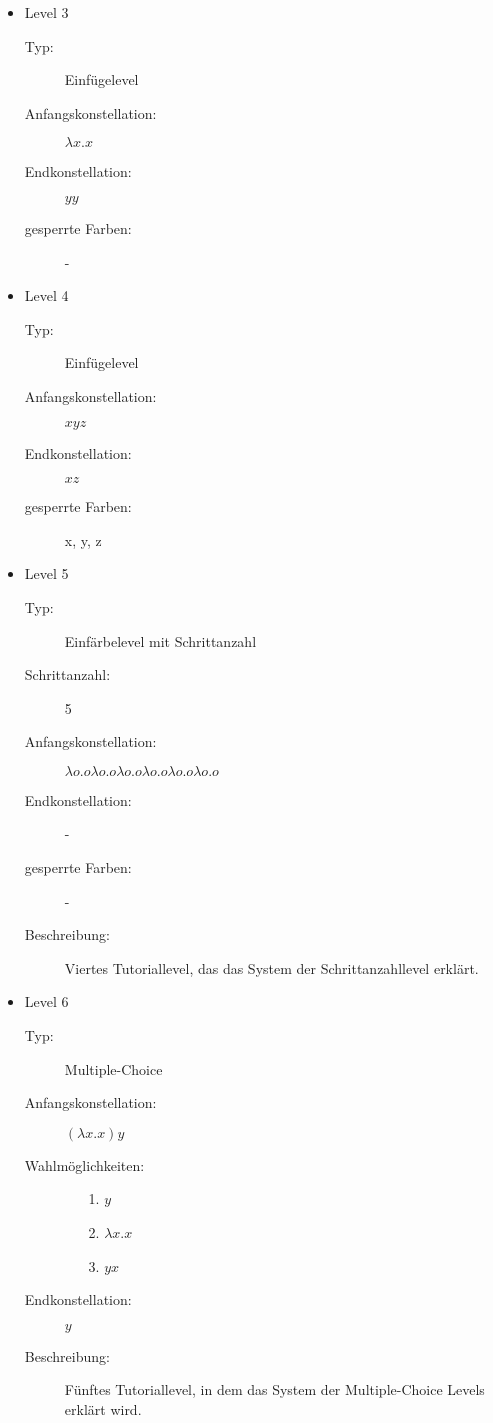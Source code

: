 \begin{itemize}
	\item{Level 3} 
		\begin{description}
			\item[Typ:] Einfügelevel
			\item[Anfangskonstellation:] \(\lambda x . x \)    
			\item[Endkonstellation:] \(y y\)
			\item[gesperrte Farben:] - 
		\end{description}

	\item{Level 4} 
		\begin{description}
			\item[Typ:] Einfügelevel
			\item[Anfangskonstellation:] \(x y z\)    
			\item[Endkonstellation:]  \(x z\)
			\item[gesperrte Farben:] x, y, z
		\end{description}

	\item{Level 5} 
		\begin{description}
			\item[Typ:] Einfärbelevel mit Schrittanzahl
			\item[Schrittanzahl:] 5
			\item[Anfangskonstellation:] \(\lambda o . o   \lambda o . o  \lambda o . o   \lambda o . o  \lambda o . o   \lambda o . o \) 
			\item[Endkonstellation:]  -
			\item[gesperrte Farben:] -
			\item[Beschreibung:] Viertes Tutoriallevel, das das System der Schrittanzahllevel erklärt.
		\end{description}

	\item{Level 6} 
		\begin{description}
			\item[Typ:] Multiple-Choice 
			\item[Anfangskonstellation:] \((\lambda x . x ) y\)    
			\item[Wahlmöglichkeiten:] \hfill
				\begin{itemize}
					\item[1.] \(y\)
					\item[2.] \(\lambda x . x \) 
					\item[3.] \(y x\)
				\end{itemize}
			\item[Endkonstellation:] \(y\)
			\item[Beschreibung:] Fünftes Tutoriallevel, in dem das System der Multiple-Choice Levels erklärt wird.
		\end{description}


\end{itemize}
